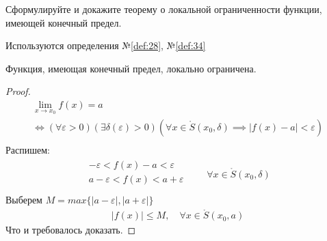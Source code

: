 \begin{question}
    Сформулируйте и докажите теорему о локальной ограниченности функции, имеющей конечный предел.
\end{question}
\begin{used}
    Используются определения №\ref{def:28}, №\ref{def:34}
\end{used}
\begin{theorem}
    Функция, имеющая конечный предел, локально ограничена.
\end{theorem}
\begin{proof}
    \begin{gather*}
        \lim_{x \to x_0} f(x) = a \\
        \iff (\forall \varepsilon > 0)(\exists \delta(\varepsilon) > 0) (\forall x \in \mathring{S}(x_0, \delta) \implies |f(x) - a| < \varepsilon) \\
    \end{gather*}
    Распишем:
    \begin{gather*}
        \begin{matrix}
            - \varepsilon < f(x) - a < \varepsilon \\
            a - \varepsilon < f(x) < a + \varepsilon \\
        \end{matrix}
        \qquad
        \forall  x \in \mathring{S}(x_0, \delta)
    \end{gather*}
    Выберем $M = max\{|a - \varepsilon|, |a + \varepsilon|\}$ 
    \begin{gather*}
        |f(x)| \le  M, \quad \forall  x \in  \mathring{S}(x_0, a)
    \end{gather*}
    Что и требовалось доказать.
\end{proof}



